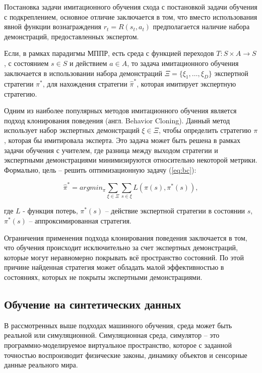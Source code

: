        Постановка задачи имитационного обучения схода с постановкой задачи обучения с подкреплением, основное отличие заключается в том, что вместо использования явной функции вознаграждения $r_t = R(s_t, a_t)$ предполагается наличие набора демонстраций, предоставленных экспертом.

        Если, в рамках парадигмы МППР, есть среда с функцией переходов $T: S \times A \to S$, с состоянием $s \in S$ и действием $a \in A$, то задача имитационного обучения заключается в использовании набора демонстраций $\Xi = \{ \xi_1, \dots, \xi_D\}$ экспертной стратегии $\pi^*$, для нахождения стратегии $\hat{\pi}^*$, которая имитирует экспертную стратегию.

        Одним из наиболее популярных методов имитационного обучения является подход клонирования поведения (англ. Behavior Cloning). Данный метод использует набор экспертных демонстраций $\xi \in \Xi$, чтобы определить стратегию $\pi$, которая бы имитировала эксперта. Это задача может быть решена в рамках задачи обучения с учителем, где разница между выходом стратегии и экспертными демонстрациями минимизируются относительно некоторой метрики. Формально, цель -- решить оптимизационную задачу (\ref{eq:bc}):

        \begin{equation}
            \hat{\pi}^* = argmin_{\pi} \sum_{\xi \in \Xi} \sum_{s \in \xi} L (\pi(s), \pi^*(s)),
            \label{eq:bc}
        \end{equation}

        где $L$ - функция потерь, $\pi^*(s)$ -- действие экспертной стратегии в состоянии $s$, $\pi^* (s)$ -- аппроксимированная стратегия. 

        Ограничения применения подхода клонирования поведения заключается в том, что обучения происходит исключительно за счет экспертных демонстраций, которые могут неравномерно покрывать всё пространство состояний. По этой причине найденная стратегия может обладать малой эффективностью в состояниях, которых не покрыты экспертными демонстрациями.
        

\subsection{Обучение на синтетических данных}

    В рассмотренных выше подходах машинного обучения, среда может быть реальной или симуляционной. Симуляционная среда, симулятор -- это программно-моделируемое виртуальное пространство, которое с заданной точностью воспроизводит физические законы, динамику объектов и сенсорные данные реального мира.

